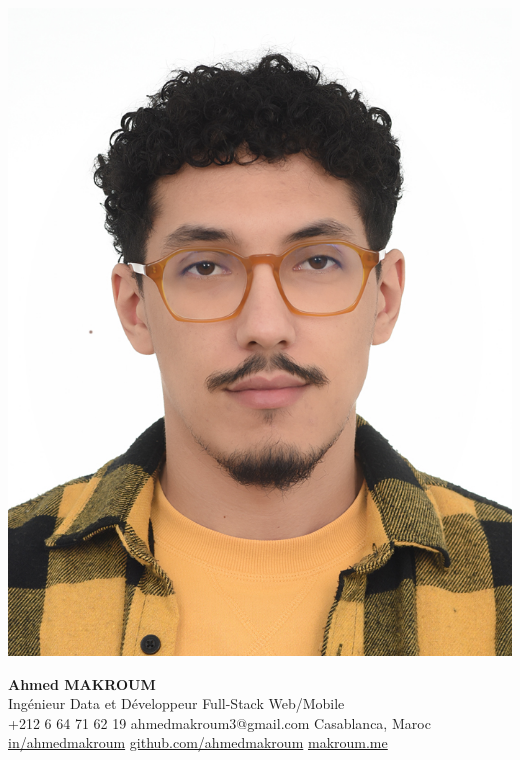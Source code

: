 \documentclass[12pt,a4paper,sans]{moderncv}
\begin{document}
    \begin{minipage}{0.15\textwidth}
        \includegraphics[width=\linewidth]{images/ahmed.jpg}
    \end{minipage}
    \hfill
    \begin{minipage}{0.82\textwidth}
        \centering
        {\fontsize{25}{28}\selectfont\textbf{Ahmed MAKROUM}}\\[0.3em]
        {\fontsize{15}{18}\selectfont Ingénieur Data et Développeur Full-Stack Web/Mobile} \\[0.4em]
        {\fontsize{11}{13}\selectfont
            \faMobile\enspace +212 6 64 71 62 19 \quad
            \faEnvelope\enspace ahmedmakroum3@gmail.com \quad
            \faHome\enspace Casablanca, Maroc \\[0.3em]
            \faLinkedin\enspace \href{https://www.linkedin.com/in/ahmed-makroum/}{in/ahmedmakroum} \quad
            \faGithub\enspace \href{https://github.com/ahmedmakroum}{github.com/ahmedmakroum} \quad
            \faGlobe\enspace \href{https://ahmedmakroum.github.io/AhmedMakroumPortfolio/}{makroum.me}
        }
    \end{minipage}
\end{document}
